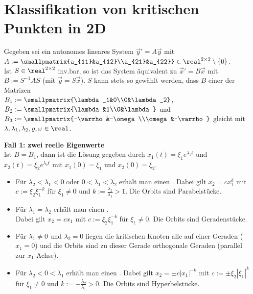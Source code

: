 \pagebreak

\section{%
    Klassifikation von kritischen Punkten in 2D%
}

Gegeben sei ein autonomes lineares System $\vec{y}' = A\vec{y}$ mit
$A := \smallpmatrix{a_{11}&a_{12}\\a_{21}&a_{22}} \in \real^{2 \times 2} \setminus \{0\}$.\\
Ist $S \in \real^{2 \times 2}$ inv.bar, so ist das System äquivalent zu
$\vec{x}' = B\vec{x}$ mit $B := S^{-1} AS$ (mit $\vec{y} = S\vec{x}$).
$S$ kann stets so gewählt werden, dass $B$ einer der Matrizen\\
$B_1 := \smallpmatrix{\lambda_1&0\\0&\lambda_2}$,
$B_2 := \smallpmatrix{\lambda&1\\0&\lambda}$ und
$B_3 := \smallpmatrix{-\varrho&-\omega\\\omega&-\varrho}$
gleicht mit $\lambda, \lambda_1, \lambda_2, \varrho, \omega \in \real$.

\textbf{Fall 1: zwei reelle Eigenwerte}\\
Ist $B = B_1$, dann ist die Lösung gegeben durch $x_1(t) = \xi_1 e^{\lambda_1 t}$ und
$x_2(t) = \xi_2 e^{\lambda_2 t}$ mit $x_1(0) = \xi_1$ und $x_2(0) = \xi_2$.
\begin{itemize}
    \item
    Für $\lambda_2 < \lambda_1 < 0$ oder $0 < \lambda_1 < \lambda_2$
    erhält man einen .
    Dabei gilt $x_2 = cx_1^k$ mit
    $c := \xi_2 \xi_1^{-k}$ für $\xi_1 \not= 0$
    und $k := \frac{\lambda_2}{\lambda_1} > 1$.
    Die Orbits sind Parabelstücke.

    \item
    Für $\lambda_1 = \lambda_2$ erhält man einen
    .\\
    Dabei gilt $x_2 = cx_1$ mit $c := \xi_2 \xi_1^{-k}$ für $\xi_1 \not= 0$.
    Die Orbits sind Geradenstücke.

    \item
    Für $\lambda_1 \not= 0$ und $\lambda_2 = 0$ liegen die kritischen Knoten alle auf
    einer Geraden ($x_1 = 0$) und die Orbits sind zu dieser Gerade orthogonale Geraden
    (parallel zur $x_1$-Achse).

    \item
    Für $\lambda_2 < 0 < \lambda_1$ erhält man einen .
    Dabei gilt $x_2 = \pm c|x_1|^{-k}$ mit
    $c := \pm\xi_2 |\xi_1|^k$ für $\xi_1 \not= 0$
    und $k := -\frac{\lambda_2}{\lambda_1} > 0$.
    Die Orbits sind Hyperbelstücke.
\end{itemize}


